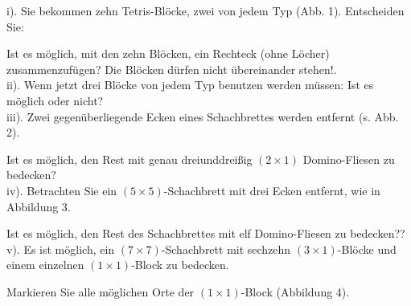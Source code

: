 \begin{multicols}{2}
i). Sie bekommen zehn Tetris-Blöcke, zwei von jedem Typ (Abb. 1). Entscheiden Sie:

Ist es möglich, mit den zehn Blöcken, ein Rechteck (ohne Löcher) zusammenzufügen? Die Blöcken dürfen nicht übereinander stehen!.\\


ii). Wenn jetzt drei Blöcke von jedem Typ benutzen werden müssen: Ist es möglich oder nicht?\\


iii). Zwei gegenüberliegende Ecken eines Schachbrettes werden entfernt (s. Abb. 2).  

Ist es möglich, den Rest mit genau dreiunddreißig $(2\times 1)$ Domino-Fliesen zu bedecken?\\


iv). Betrachten Sie ein $(5\times 5)$-Schachbrett mit drei
Ecken entfernt, wie in Abbildung 3.
  
Ist es möglich, den Rest des Schachbrettes mit elf Domino-Fliesen zu bedecken??\\


v). Es ist möglich, ein $(7\times 7)$-Schachbrett mit sechzehn $(3\times 1)$-Blöcke und einem einzelnen $(1\times 1)$-Block zu bedecken.

Markieren Sie alle möglichen Orte der $(1\times 1)$-Block (Abbildung 4).


\columnbreak


\end{multicols}
